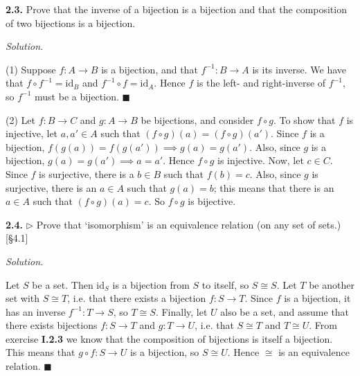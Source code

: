 \documentclass[14pt,parskip=full]{scrartcl}
\newcommand{\exercise}[3]{
\noindent
\textbf{#1.} #2

\noindent
\textit{Solution.}{\let\tpar\par \let\par\relax #3}
}
\newcommand*{\QEDA}{\hfill\ensuremath{\blacksquare}}
\newcommand{\id}{\mathrm{id}}
\begin{document}
\exercise
{2.3}{Prove that the inverse of a bijection is a bijection and that the
composition of two bijections is a bijection.}{

(1) Suppose $f:A\to B$ is a bijection, and that $f^{-1}:B\to A$ is its inverse.
We have that $f\circ f^{-1} = \id_B$ and $f^{-1}\circ f = \id_A$. Hence $f$ is
the left- and right-inverse of $f^{-1}$, so $f^{-1}$ must be a bijection.
\QEDA

\tpar
(2) Let $f:B\to C$ and $g:A\to B$ be bijections, and consider $f\circ g$. To
show that $f$ is injective, let $a, a'\in A$ such that $(f\circ g)(a) = (f\circ
g)(a')$. Since $f$ is a bijection, $f(g(a)) = f(g(a')) \implies g(a) = g(a')$.
Also, since $g$ is a bijection, $g(a) = g(a') \implies a=a'$. Hence $f\circ g$
is injective. Now, let $c\in C$. Since $f$ is surjective, there is a $b\in B$
such that $f(b) = c$. Also, since $g$ is surjective, there is an $a\in A$ such
that $g(a) = b$; this means that there is an $a\in A$ such that $(f\circ g)(a) =
c$. So $f\circ g$ is bijective.

}

\exercise{2.4}{$\rhd$ Prove that `isomorphism' is an equivalence relation (on any set
of sets.) [\S4.1]}{

Let $S$ be a set. Then $\id_S$ is a bijection from $S$ to itself, so $S\cong S$.
Let $T$ be another set with $S\cong T$, i.e. that there exists a bijection
$f:S\to T$. Since $f$ is a bijection, it has an inverse $f^{-1}:T\to S$, so
$T\cong S$. Finally, let $U$ also be a set, and assume that there exists
bijections $f:S\to T$ and $g:T\to U$, i.e. that $S\cong T$ and $T\cong U$. From
exercise \textbf{I.2.3} we know that the composition of bijections is itself a
bijection. This means that $g\circ f: S\to U$ is a bijection, so $S\cong U$.
Hence $\cong$ is an equivalence relation.
\QEDA

}
\end{document}
